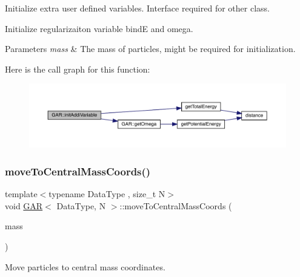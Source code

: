 Initialize extra user defined variables. Interface required for other class. 

Initialize regularizaiton variable bindE and omega. 
\begin{DoxyParams}{Parameters}
{\em mass} & The mass of particles, might be required for initialization. \\
\hline
\end{DoxyParams}
Here is the call graph for this function\+:\nopagebreak
\begin{figure}[H]
\begin{center}
\leavevmode
\includegraphics[width=350pt]{class_g_a_r_a31b5ad2527cc52d1422fa11e2d93fbc6_cgraph}
\end{center}
\end{figure}
\mbox{\label{class_g_a_r_a373d938047a04b051683ee93198b1832}} 
\subsubsection{\texorpdfstring{move\+To\+Central\+Mass\+Coords()}{moveToCentralMassCoords()}}
{\footnotesize\ttfamily template$<$typename Data\+Type , size\+\_\+t N$>$ \\
void \mbox{\hyperlink{class_g_a_r}{G\+AR}}$<$ Data\+Type, N $>$\+::move\+To\+Central\+Mass\+Coords (\begin{DoxyParamCaption}\item[{\mbox{\hyperlink{class_g_a_r_a0b446684ae922457a3bf86c904085d8a}{Scalar\+Array}} \&}]{mass }\end{DoxyParamCaption})\hspace{0.3cm}{\ttfamily [inline]}}



Move particles to central mass coordinates. 

